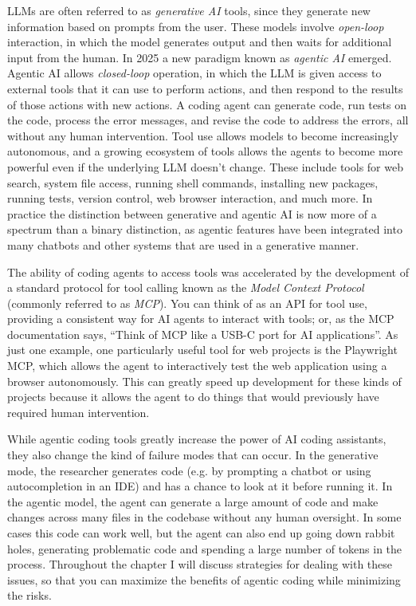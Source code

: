 LLMs are often referred to as \textit{generative AI} tools, since they generate new information based on prompts from the user.  These models involve \textit{open-loop} interaction, in which the model generates output and then waits for additional input from the human.  In 2025 a new paradigm known as \textit{agentic AI} emerged. Agentic AI allows \textit{closed-loop} operation, in which the LLM is given access to external tools that it can use to perform actions, and then respond to the results of those actions with new actions. A coding agent can generate code, run tests on the code, process the error messages, and revise the code to address the errors, all without any human intervention.  Tool use allows models to become increasingly autonomous, and a growing ecosystem of tools allows the agents to become more powerful even if the underlying LLM doesn't change. These include tools for web search, system file access, running shell commands, installing new packages, running tests, version control, web browser interaction, and much more. In practice the distinction between generative and agentic AI is now more of a spectrum than a binary distinction, as agentic features have been integrated into many chatbots and other systems that are used in a generative manner.

The ability of coding agents to access tools was accelerated by the development of a standard protocol for tool calling known as the \textit{Model Context Protocol} (commonly referred to as \textit{MCP}). You can think of as an API for tool use, providing a consistent way for AI agents to interact with tools; or, as the MCP documentation says, ``Think of MCP like a USB-C port for AI applications''.
As just one example, one particularly useful tool for web projects is the Playwright MCP, which allows the agent to interactively test the web application using a browser autonomously.
This can greatly speed up development for these kinds of projects because it allows the agent to do things that would previously have required human intervention.

While agentic coding tools greatly increase the power of AI coding assistants, they also change the kind of failure modes that can occur.  In the generative mode, the researcher generates code (e.g. by prompting a chatbot or using autocompletion in an IDE) and has a chance to look at it before running it.  In the agentic model, the agent can generate a large amount of code and make changes across many files in the codebase without any human oversight.  In some cases this code can work well, but the agent can also end up going down rabbit holes, generating problematic code and spending a large number of tokens in the process.  Throughout the chapter I will discuss strategies for dealing with these issues, so that you can maximize the benefits of agentic coding while minimizing the risks.

